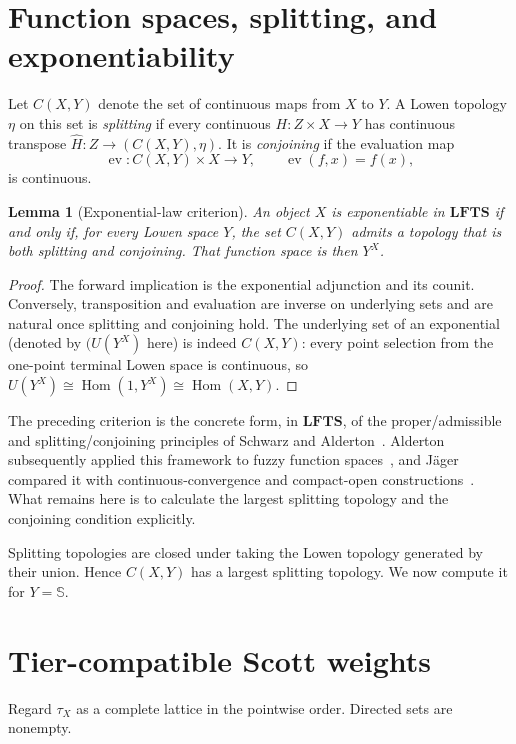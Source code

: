 \documentclass[10pt,a4paper]{amsart}
\numberwithin{equation}{section}
\newtheorem{lemma}[theorem]{Lemma}
\newcommand{\Sier}{\mathbb S}
\newcommand{\LFTS}{\mathbf{LFTS}}
\newcommand{\ev}{\operatorname{ev}}
\newcommand{\Hom}{\operatorname{Hom}}
\begin{document}
\section{Function spaces, splitting, and exponentiability}

Let \(C(X,Y)\) denote the set of continuous maps from \(X\) to \(Y\).
A Lowen topology \(\eta\) on this set is \emph{splitting} if every
continuous \(H:Z\times X\to Y\) has continuous transpose
\(\widehat H:Z\to(C(X,Y),\eta)\).  It is \emph{conjoining} if the
evaluation map
\[
 \ev:C(X,Y)\times X\to Y,\qquad \ev(f,x)=f(x),
\]
is continuous.

\begin{lemma}[Exponential-law criterion]\label{lem:exp-law-en}
An object \(X\) is exponentiable in \(\LFTS\) if and only if, for every
Lowen space \(Y\), the set \(C(X,Y)\) admits a topology that is both
splitting and conjoining.  That function space is then \(Y^X\).
\end{lemma}

\begin{proof}
The forward implication is the exponential adjunction and its counit.
Conversely, transposition and evaluation are inverse on underlying sets
and are natural once splitting and conjoining hold.  The underlying set
of an exponential (denoted by $(U(Y^X)$ here) is indeed \(C(X,Y)\): every point selection from the
one-point terminal Lowen space is continuous, so
\(U(Y^X)\cong\Hom(1,Y^X)\cong\Hom(X,Y)\).
\end{proof}

The preceding criterion is the concrete form, in \(\LFTS\), of the
proper/admissible and splitting/conjoining principles of Schwarz and
Alderton~\cite{Schwarz1983-en,Alderton1988-en}.  Alderton subsequently
applied this framework to fuzzy function spaces~\cite{Alderton1989-en},
and J\"ager compared it with continuous-convergence and compact-open
constructions~\cite{Jager1999-en}.  What remains here is to calculate
the largest splitting topology and the conjoining condition explicitly.

Splitting topologies are closed under taking the Lowen topology generated
by their union.  Hence \(C(X,Y)\) has a largest splitting topology.  We
now compute it for \(Y=\Sier\).

\section{Tier-compatible Scott weights}

Regard \(\tau_X\) as a complete lattice in the pointwise order.  Directed
sets are nonempty.
\end{document}
